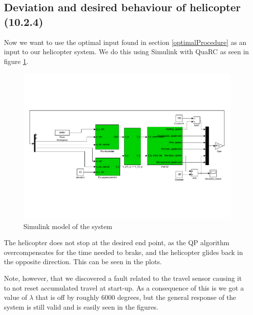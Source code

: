 \subsection{Deviation and desired behaviour of helicopter (10.2.4)}
Now we want to use the optimal input found in section \ref{optimalProcedure} as an input to our helicopter system. We do this using Simulink with QuaRC as seen in figure \ref{fig:heldag2}.
\begin{figure}[H]
	\centering
	\includegraphics[width=\textwidth, trim=2cm 6cm 2cm 2cm]{simulinkmodels/heldag2}
	\caption{Simulink model of the system}
	\label{fig:heldag2}
\end{figure}

The helicopter does not stop at the desired end point, as the QP algorithm overcompensates for the time needed to brake, and the helicopter glides back in the opposite direction. This can be seen in the plots.

Note, however, that we discovered a fault related to the travel sensor causing it to not reset accumulated travel at start-up. As a consequence of this is we got a value of $\lambda$ that is off by roughly 6000 degrees, but the general response of the system is still valid and is easily seen in the figures.

